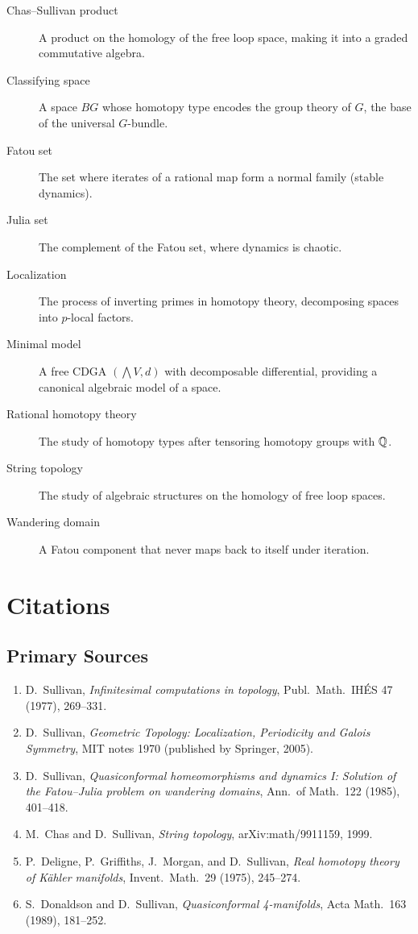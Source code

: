 \begin{description}
    \item[Chas--Sullivan product] A product on the homology of the free loop space, making it into a graded commutative algebra.
    \item[Classifying space] A space $BG$ whose homotopy type encodes the group theory of $G$, the base of the universal $G$-bundle.
    \item[Fatou set] The set where iterates of a rational map form a normal family (stable dynamics).
    \item[Julia set] The complement of the Fatou set, where dynamics is chaotic.
    \item[Localization] The process of inverting primes in homotopy theory, decomposing spaces into $p$-local factors.
    \item[Minimal model] A free CDGA $(\bigwedge V, d)$ with decomposable differential, providing a canonical algebraic model of a space.
    \item[Rational homotopy theory] The study of homotopy types after tensoring homotopy groups with $\mathbb{Q}$.
    \item[String topology] The study of algebraic structures on the homology of free loop spaces.
    \item[Wandering domain] A Fatou component that never maps back to itself under iteration.
\end{description}

\section{Citations}\subsection*{Primary Sources}
\begin{enumerate}
    \item D.\ Sullivan, \textit{Infinitesimal computations in topology}, Publ.\ Math.\ IH\'ES 47 (1977), 269--331.
    \item D.\ Sullivan, \textit{Geometric Topology: Localization, Periodicity and Galois Symmetry}, MIT notes 1970 (published by Springer, 2005).
    \item D.\ Sullivan, \textit{Quasiconformal homeomorphisms and dynamics I: Solution of the Fatou--Julia problem on wandering domains}, Ann.\ of Math.\ 122 (1985), 401--418.
    \item M.\ Chas and D.\ Sullivan, \textit{String topology}, arXiv:math/9911159, 1999.
    \item P.\ Deligne, P.\ Griffiths, J.\ Morgan, and D.\ Sullivan, \textit{Real homotopy theory of K\"ahler manifolds}, Invent.\ Math.\ 29 (1975), 245--274.
    \item S.\ Donaldson and D.\ Sullivan, \textit{Quasiconformal 4-manifolds}, Acta Math.\ 163 (1989), 181--252.
\end{enumerate}

